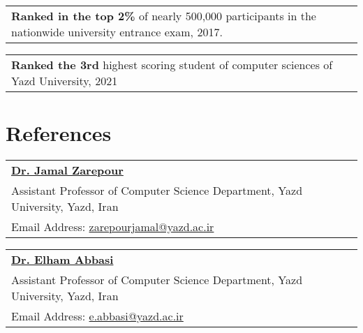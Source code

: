 \documentclass[letter,12pt]{article}
\begin{document}
\begin{tabularx}{\linewidth}{ @{}l X@{} }
\textbf{Ranked in the top 2\%} of nearly 500,000 participants in the nationwide university entrance exam, 2017.\\
\end{tabularx}

\vspace{-0.2cm}

\begin{tabularx}{\linewidth}{ @{}l X@{} }
\textbf{Ranked the 3rd} highest scoring student of computer sciences of Yazd University, 2021 \\
\end{tabularx}



\section{References}

\begin{tabularx}{\linewidth}{ @{}l X@{} }
\href{https://pws.yazd.ac.ir/jzarepour/}{\textbf{\color{black}Dr. Jamal Zarepour}}\\
\hspace{0.9cm}Assistant Professor of Computer Science Department, Yazd University, Yazd, Iran \\
\hspace{0.9cm}Email Address: \href{mailto:zarepourjamal@yazd.ac.ir}{zarepourjamal@yazd.ac.ir} \\
\end{tabularx}


\begin{tabularx}{\linewidth}{ @{}l X@{} }
\href{https://yazd.ac.ir/people/e.abbasi/}{\textbf{\color{black}Dr. Elham Abbasi}}\\
\hspace{0.9cm}Assistant Professor of Computer Science Department, Yazd University, Yazd, Iran \\
\hspace{0.9cm}Email Address: \href{mailto:e.abbasi@yazd.ac.ir@yazd.ac.ir}{e.abbasi@yazd.ac.ir} \\
\end{tabularx}




\end{document}
